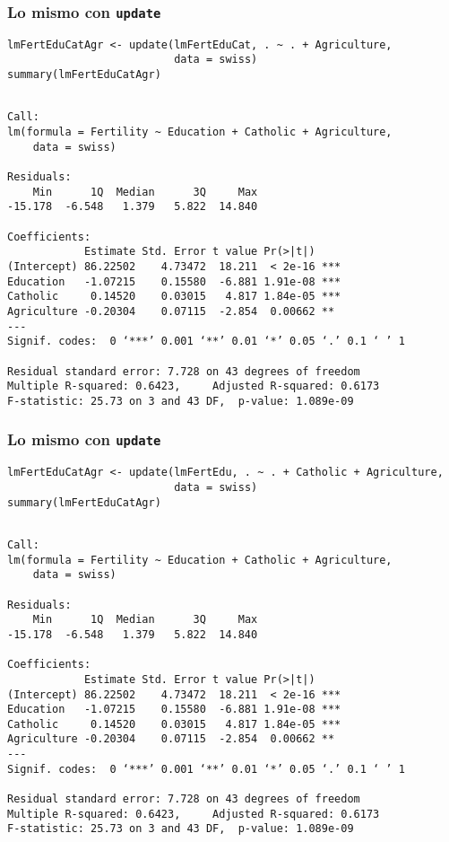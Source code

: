 \documentclass{beamer}
\begin{document}
\begin{frame}[fragile]
\frametitle{Lo mismo con \texttt{update}}
\label{sec-3-6}


\lstset{language=R}
\begin{lstlisting}
lmFertEduCatAgr <- update(lmFertEduCat, . ~ . + Agriculture,
                          data = swiss)
summary(lmFertEduCatAgr)
\end{lstlisting}


\begin{verbatim}

Call:
lm(formula = Fertility ~ Education + Catholic + Agriculture, 
    data = swiss)

Residuals:
    Min      1Q  Median      3Q     Max 
-15.178  -6.548   1.379   5.822  14.840 

Coefficients:
            Estimate Std. Error t value Pr(>|t|)    
(Intercept) 86.22502    4.73472  18.211  < 2e-16 ***
Education   -1.07215    0.15580  -6.881 1.91e-08 ***
Catholic     0.14520    0.03015   4.817 1.84e-05 ***
Agriculture -0.20304    0.07115  -2.854  0.00662 ** 
---
Signif. codes:  0 ‘***’ 0.001 ‘**’ 0.01 ‘*’ 0.05 ‘.’ 0.1 ‘ ’ 1 

Residual standard error: 7.728 on 43 degrees of freedom
Multiple R-squared: 0.6423,     Adjusted R-squared: 0.6173 
F-statistic: 25.73 on 3 and 43 DF,  p-value: 1.089e-09
\end{verbatim}
\end{frame}
\begin{frame}[fragile]
\frametitle{Lo mismo con \texttt{update}}
\label{sec-3-7}


\lstset{language=R}
\begin{lstlisting}
lmFertEduCatAgr <- update(lmFertEdu, . ~ . + Catholic + Agriculture,
                          data = swiss)
summary(lmFertEduCatAgr)
\end{lstlisting}


\begin{verbatim}

Call:
lm(formula = Fertility ~ Education + Catholic + Agriculture, 
    data = swiss)

Residuals:
    Min      1Q  Median      3Q     Max 
-15.178  -6.548   1.379   5.822  14.840 

Coefficients:
            Estimate Std. Error t value Pr(>|t|)    
(Intercept) 86.22502    4.73472  18.211  < 2e-16 ***
Education   -1.07215    0.15580  -6.881 1.91e-08 ***
Catholic     0.14520    0.03015   4.817 1.84e-05 ***
Agriculture -0.20304    0.07115  -2.854  0.00662 ** 
---
Signif. codes:  0 ‘***’ 0.001 ‘**’ 0.01 ‘*’ 0.05 ‘.’ 0.1 ‘ ’ 1 

Residual standard error: 7.728 on 43 degrees of freedom
Multiple R-squared: 0.6423,     Adjusted R-squared: 0.6173 
F-statistic: 25.73 on 3 and 43 DF,  p-value: 1.089e-09
\end{verbatim}
\end{frame}
\end{document}
